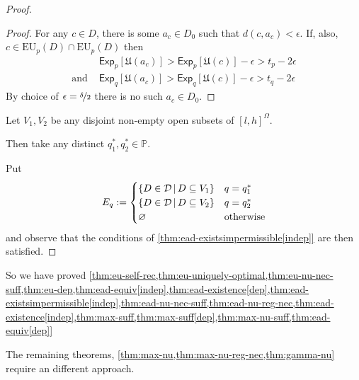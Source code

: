 \documentclass[a4paper]{article}
\newcommand\A{\mathcal{A}}
\renewcommand\P{\mathbb{P}} %
\newcommand\Exp{\mathsf{Exp}}
\newcommand\EU{\mathrm{EU}}
\newcommand\U{\mathfrak{U}} %
\newcommand{\Decs}{\mathcal{D}}
\newcommand{\IP}{\P}
\renewcommand{\color}[1]{}
\newenvironment{colored}[1]{\leavevmode\color{#1}}{}
\newcommand\SetDelimiter[1][]{
	\nonscript\,#1\vert \allowbreak \nonscript\,\mathopen{}}
\providecommand\given{\SetDelimiter}
\renewcommand{\emptyset}{\varnothing}
\renewcommand{\leq}{\leqslant}
\newenvironment{CCM rewritten}
{\begingroup\color{blue}} %
{\endgroup}              %
\begin{document}
\begin{colored}{violet}
\begin{proof}
\begin{proof}
		For any $c\in D$, there is some $a_c\in D_0$ such that $d(c,a_c)<\epsilon$. If, also,  $c\in \EU_{p}(D)\cap\EU_{p}(D)$ then 
		\begin{align}
			&\Exp_{p}[\U(a_c)]>\Exp_{p}[\U(c)]-\epsilon>t_p-2\epsilon\\
			\text{and }&\Exp_{q}[\U(a_c)]>\Exp_{q}[\U(c)]-\epsilon>t_q-2\epsilon
		\end{align}
		By choice of $\epsilon=\nicefrac{\delta}{2}$ there is no such $a_c\in D_0$. 
	\end{proof}
	
	Let $V_1,V_2$ be any disjoint non-empty open subsets of $[l,h]^\Omega$. 
	
	Then take any distinct $q^*_1,q^*_2\in\IP$. 
	
	Put $$E_q:=\begin{cases}
		\{D\in\Decs\given D\subseteq V_1\}&q=q^*_1\\
			\{D\in\Decs\given D\subseteq V_2\}&q=q^*_2\\
		\emptyset&\text{otherwise}
	\end{cases}$$
	and observe that the conditions of \cref{thm:ead-existsimpermissible[indep]} are then satisfied. 
\end{proof}




So we have proved \cref{thm:eu-self-rec,thm:eu-uniquely-optimal,thm:eu-nu-nec-suff,thm:eu-dep,thm:ead-equiv[indep],thm:ead-existence[dep],thm:ead-existsimpermissible[indep],thm:ead-nu-nec-suff,thm:ead-nu-reg-nec,thm:ead-existence[indep],thm:max-suff,thm:max-suff[dep],thm:max-nu-suff,thm:ead-equiv[dep]}

The remaining theorems, \cref{thm:max-nu,thm:max-nu-reg-nec,thm:gamma-nu} require an different approach.

\end{colored}
\end{document}
